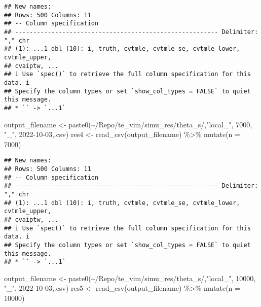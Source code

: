 \documentclass[
]{article}
\newenvironment{Shaded}{\begin{snugshade}}{\end{snugshade}}
\newcommand{\AttributeTok}[1]{\textcolor[rgb]{0.77,0.63,0.00}{#1}}
\newcommand{\DecValTok}[1]{\textcolor[rgb]{0.00,0.00,0.81}{#1}}
\newcommand{\FunctionTok}[1]{\textcolor[rgb]{0.00,0.00,0.00}{#1}}
\newcommand{\NormalTok}[1]{#1}
\newcommand{\OtherTok}[1]{\textcolor[rgb]{0.56,0.35,0.01}{#1}}
\newcommand{\SpecialCharTok}[1]{\textcolor[rgb]{0.00,0.00,0.00}{#1}}
\newcommand{\StringTok}[1]{\textcolor[rgb]{0.31,0.60,0.02}{#1}}
\begin{document}
\begin{verbatim}
## New names:
## Rows: 500 Columns: 11
## -- Column specification
## -------------------------------------------------------- Delimiter: "," chr
## (1): ...1 dbl (10): i, truth, cvtmle, cvtmle_se, cvtmle_lower, cvtmle_upper,
## cvaiptw, ...
## i Use `spec()` to retrieve the full column specification for this data. i
## Specify the column types or set `show_col_types = FALSE` to quiet this message.
## * `` -> `...1`
\end{verbatim}

\begin{Shaded}
\begin{Highlighting}[]
\NormalTok{output\_filename }\OtherTok{\textless{}{-}} \FunctionTok{paste0}\NormalTok{(}\StringTok{\textquotesingle{}\textasciitilde{}/Repo/te\_vim/simu\_res/theta\_s/\textquotesingle{}}\NormalTok{,}\StringTok{"local\_"}\NormalTok{, }\DecValTok{7000}\NormalTok{, }\StringTok{"\_"}\NormalTok{, }\StringTok{\textquotesingle{}2022{-}10{-}03\textquotesingle{}}\NormalTok{,}\StringTok{\textquotesingle{}.csv\textquotesingle{}}\NormalTok{)}
\NormalTok{res4 }\OtherTok{\textless{}{-}} \FunctionTok{read\_csv}\NormalTok{(output\_filename) }\SpecialCharTok{\%\textgreater{}\%} \FunctionTok{mutate}\NormalTok{(}\AttributeTok{n =} \DecValTok{7000}\NormalTok{)}
\end{Highlighting}
\end{Shaded}

\begin{verbatim}
## New names:
## Rows: 500 Columns: 11
## -- Column specification
## -------------------------------------------------------- Delimiter: "," chr
## (1): ...1 dbl (10): i, truth, cvtmle, cvtmle_se, cvtmle_lower, cvtmle_upper,
## cvaiptw, ...
## i Use `spec()` to retrieve the full column specification for this data. i
## Specify the column types or set `show_col_types = FALSE` to quiet this message.
## * `` -> `...1`
\end{verbatim}

\begin{Shaded}
\begin{Highlighting}[]
\NormalTok{output\_filename }\OtherTok{\textless{}{-}} \FunctionTok{paste0}\NormalTok{(}\StringTok{\textquotesingle{}\textasciitilde{}/Repo/te\_vim/simu\_res/theta\_s/\textquotesingle{}}\NormalTok{,}\StringTok{"local\_"}\NormalTok{, }\DecValTok{10000}\NormalTok{, }\StringTok{"\_"}\NormalTok{, }\StringTok{\textquotesingle{}2022{-}10{-}03\textquotesingle{}}\NormalTok{,}\StringTok{\textquotesingle{}.csv\textquotesingle{}}\NormalTok{)}
\NormalTok{res5 }\OtherTok{\textless{}{-}} \FunctionTok{read\_csv}\NormalTok{(output\_filename) }\SpecialCharTok{\%\textgreater{}\%} \FunctionTok{mutate}\NormalTok{(}\AttributeTok{n =} \DecValTok{10000}\NormalTok{)}
\end{Highlighting}
\end{Shaded}
\end{document}
